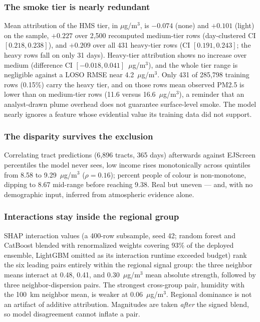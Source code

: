 \documentclass[conference]{IEEEtran}
\newcommand{\ugm}{$\mu$g/m$^3$}
\begin{document}
\subsubsection{The smoke tier is nearly redundant} Mean
attribution of the HMS tier, in \ugm{}, is $-0.074$ (none) and $+0.101$
(light) on the sample, $+0.227$ over 2,500 recomputed medium-tier rows
(day-clustered CI $[0.218, 0.238]$), and $+0.209$ over all 431 heavy-tier
rows (CI $[0.191, 0.243]$; the heavy rows fall on only 31 days). Heavy-tier
attribution shows no increase over medium (difference CI
$[-0.018, 0.041]$~\ugm{}), and the whole tier range is negligible against
a LOSO RMSE near 4.2~\ugm{}. Only 431 of
285,798 training rows (0.15\%) carry the heavy tier, and on those rows mean
observed PM2.5 is lower than on medium-tier rows (11.6 versus
16.6~\ugm{}), a reminder that an analyst-drawn plume overhead does not
guarantee surface-level smoke. The model nearly ignores a feature whose
evidential value its training data did not support.

\subsubsection{The disparity survives the exclusion} Correlating tract
predictions (6,896 tracts, 365 days) afterwards against EJScreen percentiles
the model never sees, low income rises monotonically across quintiles from
8.58 to 9.29~\ugm{} ($\rho=0.16$); percent people of colour is non-monotone,
dipping to 8.67 mid-range before reaching 9.38. Real but uneven --- and, with
no demographic input, inferred from atmospheric evidence alone.

\subsubsection{Interactions stay inside the regional group} SHAP
interaction values (a 400-row subsample, seed 42; random forest and
CatBoost blended with renormalized weights covering 93\% of the deployed
ensemble, LightGBM omitted as its interaction runtime exceeded budget)
rank the six leading pairs entirely within the regional signal group: the
three neighbor means interact at 0.48, 0.41, and 0.30~\ugm{} mean absolute
strength, followed by three neighbor-dispersion pairs. The strongest
cross-group pair, humidity with the 100~km neighbor mean, is weaker at
0.06~\ugm{}. Regional dominance is not an artifact of additive
attribution. Magnitudes are taken \emph{after} the signed blend, so
model disagreement cannot inflate a pair.
\end{document}
